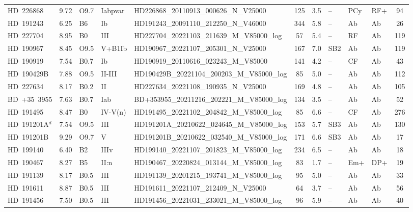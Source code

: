 {\begin{landscape}
\begin{longtable}{lclllcclllc}
\noalign{\smallskip}
HD~226868 & 9.72 & O9.7 & Iabpvar & HD226868\_20110913\_000626\_N\_V25000 & 125 & 3.5 & -- & PCy & RF+ & 94 \\
\noalign{\smallskip}
HD~191243 & 6.25 & B6 & Ib & HD191243\_20091110\_212250\_N\_V46000 & 344 & 5.8 & -- & Ab & Ab & 26 \\
\noalign{\smallskip}
HD~227704 & 8.95 & B0 & III & HD227704\_20221103\_211639\_M\_V85000\_log & 57 & 5.4 & -- & RF & Ab & 119 \\
\noalign{\smallskip}
HD~190967 & 8.45 & O9.5 & V+B1Ib & HD190967\_20221107\_205301\_N\_V25000 & 167 & 7.0 & SB2 & Ab & Ab & 119 \\
\noalign{\smallskip}
HD~190919 & 7.54 & B0.7 & Ib & HD190919\_20110616\_023243\_M\_V85000 & 141 & 4.2 & -- & CF & Ab & 43 \\
\noalign{\smallskip}
HD~190429B & 7.88 & O9.5 & II-III & HD190429B\_20221104\_200203\_M\_V85000\_log & 85 & 5.0 & -- & Ab & Ab & 112 \\
\noalign{\smallskip}
HD~227634 & 8.17 & B0.2 & II & HD227634\_20221108\_190935\_N\_V25000 & 169 & 4.8 & -- & Ab & Ab & 105 \\
\noalign{\smallskip}
BD~+35~3955 & 7.63 & B0.7 & Iab & BD+353955\_20211216\_202221\_M\_V85000\_log & 134 & 3.5 & -- & Ab & Ab & 52 \\
\noalign{\smallskip}
HD~191495 & 8.47 & B0 & IV-V(n) & HD191495\_20221102\_204842\_M\_V85000\_log & 85 & 6.6 & -- & CF & Ab & 276 \\
\noalign{\smallskip}
HD~191201A$^{d}$ & 7.54 & O9.5 & III & HD191201A\_20210622\_024645\_M\_V85000\_log & 153 & 5.7 & SB3 & Ab & Ab & 130 \\
\noalign{\smallskip}
HD~191201B & 9.29 & O9.7 & V & HD191201B\_20210622\_032540\_M\_V85000\_log & 171 & 6.6 & SB3 & Ab & Ab & 17 \\
\noalign{\smallskip}
HD~199140 & 6.40 & B2 & IIIv & HD199140\_20221107\_201823\_M\_V85000\_log & 234 & 6.5 & -- & Ab & Ab & 18 \\
\noalign{\smallskip}
HD~190467 & 8.27 & B5 & II:n & HD190467\_20220824\_013144\_M\_V85000\_log & 83 & 1.7 & -- & Em+ & DP+ & 19 \\
\noalign{\smallskip}
HD~191139 & 8.17 & B0.5 & III & HD191139\_20201215\_193741\_M\_V85000\_log & 95 & 5.0 & -- & Ab & Ab & 33 \\
\noalign{\smallskip}
HD~191611 & 8.87 & B0.5 & III & HD191611\_20221107\_212409\_N\_V25000 & 64 & 3.7 & -- & Ab & Ab & 56 \\
\noalign{\smallskip}
HD~191456 & 7.50 & B0.5 & III & HD191456\_20221031\_233021\_M\_V85000\_log & 96 & 5.9 & -- & Ab & Ab & 40 \\

\end{longtable}
\end{landscape}}

